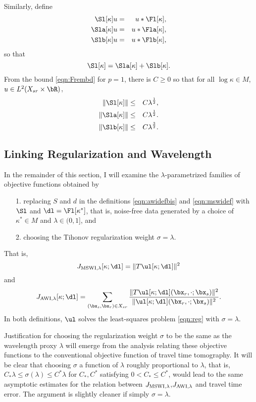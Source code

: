 Similarly, define
\begin{eqnarray}
  \label{eqn:sdeflam}
  \Sl[\kappa]u &=& u *\Fl[\kappa],  \nonumber \\
  \Sla[\kappa]u &=& u *\Fla[\kappa], \nonumber\\
  \Slb[\kappa]u &=& u *\Flb[\kappa], 
\end{eqnarray}
so that
\[
  \Sl[\kappa] = \Sla[\kappa] + \Slb[\kappa].
\]
From the bound \ref{eqn:Frembd} for $p=1$, there is $C \ge 0$ so that
for all $\log \kappa \in M$, $u \in L^2(X_{sr} \times \bR)$,
\begin{eqnarray}
  \label{eqn:Srembd}
  \|\Sl[\kappa]\| &\le&  C\lambda^{\frac{1}{2}},\nonumber \\
  \|\Sla[\kappa]\|& \le& C\lambda^{\frac{1}{2}}. \nonumber \\
  \|\Slb[\kappa]\| & \le& C\lambda^{\frac{3}{2}}.
\end{eqnarray}

\subsection{Linking Regularization and Wavelength}
In the remainder of this section, I will examine the $\lambda$-parametrized families of
objective functions obtained by
\begin{itemize}
\item[1. ]replacing $S$ and $d$ in the definitions \ref{eqn:awidefbis}
  and \ref{eqn:mswidef} with $\Sl$ and $\dl =\Fl[\kappa^*]$, that is,
  noise-free data generated by a choice of $\kappa^* \in M$ and
  $\lambda \in (0,1]$, and
\item[2. ] choosing the Tihonov regularization weight
  $\sigma = \lambda$.
\end{itemize}
That is,
\begin{equation}
  \label{eqn:mswideflam}
  J_{\rm MSWI,\lambda}[\kappa;\dl] =  \|T\ul[\kappa;\dl]\|^2
\end{equation}
and 
\begin{equation}
  \label{eqn:awideflam}
  J_{\rm AWI,\lambda}[\kappa;\dl] = \sum_{(\bx_s,\bx_r) \in X_{sr}} 
  \frac{\|T\ul[\kappa;\dl](\bx_r,\cdot;\bx_s)\|^2}{\|\ul[\kappa;\dl](\bx_r,\cdot;\bx_s)\|^2}.
\end{equation}
In both definitions, $\ul$ solves the least-squares problem \ref{eqn:reg} with
$\sigma = \lambda$.

Justification for choosing the regularization weight $\sigma$ to be the same as
the wavelength proxy $\lambda$ will emerge from the analysis relating these
objective functions to the conventional objective function of travel
time tomography. It will be clear that choosing $\sigma$ a function of
$\lambda$ roughly proportional to $\lambda$, that is, $C_*\lambda \le
\sigma(\lambda) \le C^*\lambda$ for $C_*,C^*$ satisfying $0 < C_* \le
C^*$, would lead to the same asymptotic estimates for the relation
between $J_{\rm MSWI,\lambda}$,$ J_{\rm AWI,\lambda} $ and travel time
error. The argument is slightly cleaner if simply $\sigma=\lambda$.


